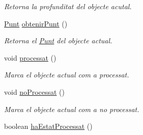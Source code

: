 \begin{DoxyCompactItemize}
\begin{DoxyCompactList}\small\item\em Retorna la profunditat del objecte acutal. \end{DoxyCompactList}\item 
\hypertarget{classlogica_1_1algoritmica_1_1_casella_afdf32ce73b821ce361044ed83a3b4003}{\hyperlink{classlogica_1_1_punt}{Punt} \hyperlink{classlogica_1_1algoritmica_1_1_casella_afdf32ce73b821ce361044ed83a3b4003}{obtenir\+Punt} ()}\label{classlogica_1_1algoritmica_1_1_casella_afdf32ce73b821ce361044ed83a3b4003}

\begin{DoxyCompactList}\small\item\em Retorna el \hyperlink{classlogica_1_1_punt}{Punt} del objecte actual. \end{DoxyCompactList}\item 
void \hyperlink{classlogica_1_1algoritmica_1_1_casella_aacd54c7a5a4c243769f7b4648f9bfd6d}{processat} ()
\begin{DoxyCompactList}\small\item\em Marca el objecte actual com a processat. \end{DoxyCompactList}\item 
void \hyperlink{classlogica_1_1algoritmica_1_1_casella_a081ffe85bdbe5d97b330c40d2881a74f}{no\+Processat} ()
\begin{DoxyCompactList}\small\item\em Marca el objecte actual com a no processat. \end{DoxyCompactList}\item 
\hypertarget{classlogica_1_1algoritmica_1_1_casella_a79b54543059fa328c5d18a96d694cf54}{boolean \hyperlink{classlogica_1_1algoritmica_1_1_casella_a79b54543059fa328c5d18a96d694cf54}{ha\+Estat\+Processat} ()}\label{classlogica_1_1algoritmica_1_1_casella_a79b54543059fa328c5d18a96d694cf54}


\end{DoxyCompactItemize}
